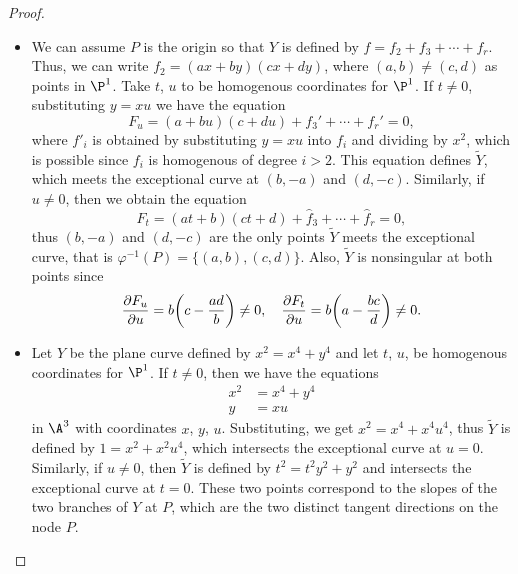 \documentclass[a4paper]{article}
\begin{document}
\begin{enumerate} [label=\textbf{\arabic*.}, leftmargin=0cm]
\begin{proof}
\begin{itemize} [leftmargin=0cm]
                  \item[(b)] We can assume $P$ is the origin so that $Y$ is defined by $f = f_2 + f_3 + \cdots + f_r$.
                  Thus, we can write $f_2 = (ax + by)(cx + dy)$, where $(a, b) \neq (c, d)$ as points in $\P^1$.
                  Take $t$, $u$ to be homogenous coordinates for $\P^1$. If $t \neq 0$, substituting $y = xu$ we have the equation
                        \begin{equation*}
                            F_u = (a + bu)(c + du) + f_3' + \cdots + f_r' = 0,
                        \end{equation*}
                        where $f'_i$ is obtained by substituting $y = xu$ into $f_i$ and dividing by $x^2$, which is possible since $f_i$ is homogenous of degree $i > 2$. This equation defines $\widetilde{Y}$, which meets the exceptional curve at $(b, -a)$ and $(d, -c)$. Similarly, if $u \neq 0$, then we obtain the equation
                        \begin{equation*}
                            F_t = (at + b)(ct + d) + \hat{f}_3 + \cdots + \hat{f}_r = 0,
                        \end{equation*}
                        thus $(b, -a)$ and $(d, -c)$ are the only points $\widetilde{Y}$ meets the exceptional curve, that is $\varphi^{-1}(P) = \{ (a, b), (c, d) \}$. Also, $\widetilde{Y}$ is nonsingular at both points since
                        \begin{equation*}
                            \pdv{F_u}{u}(0, 0, - a / b) = b\bigg( c - \frac{ad}{b} \bigg) \neq 0, \quad \pdv{F_t}{u}(0, 0, - c / d) = b\bigg( a - \frac{bc}{d} \bigg) \neq 0.
                        \end{equation*}

                  \item[(c)] Let $Y$ be the plane curve defined by $x^2 = x^4 + y^4$ and let $t$, $u$, be homogenous coordinates for $\P^1$. If $t \neq 0$, then we have the equations
                        \begin{align*}
                            x^2 & = x^4 + y^4 \\
                            y   & = xu
                        \end{align*}
                        in $\A^3$ with coordinates $x$, $y$, $u$. Substituting, we get $x^2 = x^4 + x^4 u^4$, thus $\widetilde{Y}$ is defined by $1 = x^2 + x^2u^4$, which intersects the exceptional curve at $u = 0$. Similarly, if $ u \neq 0$, then $\widetilde{Y}$ is defined by $t^2 = t^2 y^2 + y^2$ and intersects the exceptional curve at $t = 0$. These two points correspond to the slopes of the two branches of $Y$ at $P$, which are the two distinct tangent directions on the node $P$.


\end{itemize}
\end{proof}
\end{enumerate}
\end{document}
